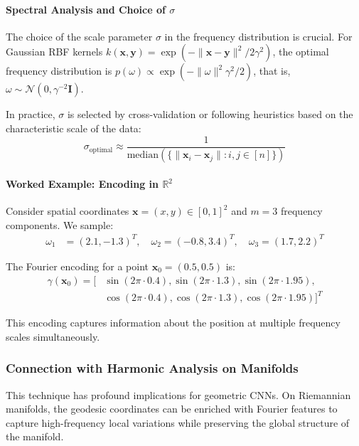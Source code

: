 \paragraph{Spectral Analysis and Choice of $\sigma$}

The choice of the scale parameter $\sigma$ in the frequency distribution is crucial. For Gaussian RBF kernels $k(\mathbf{x}, \mathbf{y}) = \exp(-\|\mathbf{x} - \mathbf{y}\|^2 / 2\gamma^2)$, the optimal frequency distribution is $p(\omega) \propto \exp(-\|\omega\|^2 \gamma^2 / 2)$, that is, $\omega \sim \mathcal{N}(0, \gamma^{-2} \mathbf{I})$.

In practice, $\sigma$ is selected by cross-validation or following heuristics based on the characteristic scale of the data:
\begin{equation}
\sigma_{\text{optimal}} \approx \frac{1}{\text{median}(\{\|\mathbf{x}_i - \mathbf{x}_j\| : i, j \in [n]\})}
\end{equation}

\paragraph{Worked Example: Encoding in $\mathbb{R}^2$}

Consider spatial coordinates $\mathbf{x} = (x, y) \in [0, 1]^2$ and $m = 3$ frequency components. We sample:
\begin{align}
\omega_1 &= (2.1, -1.3)^T, \quad \omega_2 = (-0.8, 3.4)^T, \quad \omega_3 = (1.7, 2.2)^T
\end{align}

The Fourier encoding for a point $\mathbf{x}_0 = (0.5, 0.5)$ is:
\begin{align}
\gamma(\mathbf{x}_0) = [&\sin(2\pi \cdot 0.4), \sin(2\pi \cdot 1.3), \sin(2\pi \cdot 1.95), \\
&\cos(2\pi \cdot 0.4), \cos(2\pi \cdot 1.3), \cos(2\pi \cdot 1.95)]^T
\end{align}

This encoding captures information about the position at multiple frequency scales simultaneously.

\subsubsection{Connection with Harmonic Analysis on Manifolds}

This technique has profound implications for geometric CNNs. On Riemannian manifolds, the geodesic coordinates can be enriched with Fourier features to capture high-frequency local variations while preserving the global structure of the manifold.

